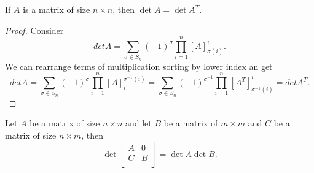 \documentclass[main.tex]{subfiles}
\begin{document}
\begin{theorem}
If $A$ is a matrix of size $n\times n$, then $\det A = \det A^T$.
\end{theorem}
\begin{proof}
Consider
\begin{equation}
det A = \sum\limits_{\sigma\in S_n} (-1)^\sigma \prod_{i=1}^n [A]^i_{\sigma(i)}.
\end{equation}
We can rearrange terms of multiplication sorting by lower index an get
\begin{equation}
det A = \sum\limits_{\sigma\in S_n} (-1)^\sigma \prod_{i=1}^n [A]^{\sigma^{-1}(i)}_i = 
\sum\limits_{\sigma\in S_n} (-1)^{\sigma^{-1}} \prod_{i=1}^n 
[A^T]^i_{\sigma^{-1}(i)} = det A^T.
\end{equation}
\end{proof}
\begin{theorem}
\label{det-0}
Let $A$ be a matrix of size $n\times n$ and let $B$ be a matrix of $m\times m$ and $C$ be a matrix of size $n\times m$, then
\begin{equation}
\det \begin{bmatrix}
    A &  0 \\
    C & B \\
\end{bmatrix} = \det A\det B.
\end{equation}
\end{theorem}
\end{document}
